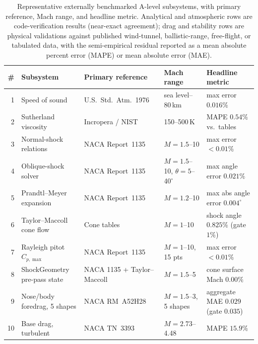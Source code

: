 \begin{table}[htbp]
\centering
\caption{Representative externally benchmarked A-level subsystems, with primary
reference, Mach range, and headline metric. Analytical and atmospheric rows are
code-verification results (near-exact agreement); drag and stability rows are
physical validations against published wind-tunnel, ballistic-range, free-flight,
or tabulated data, with the semi-empirical residual reported as a mean absolute
percent error (MAPE) or mean absolute error (MAE).}
\label{tab:benchmarks}
\begingroup\footnotesize
\begin{tabular}{@{}r p{} p{} p{} p{}@{}}
\toprule
\# & Subsystem & Primary reference & Mach range & Headline metric \\
\midrule
1  & Speed of sound                & U.S.\ Std.\ Atm.\ 1976~\cite{nasa1976ussa}        & sea level--80\,km          & max error $0.016\%$ \\
2  & Sutherland viscosity          & Incropera / NIST~\cite{incropera2007}             & 150--500\,K                & MAPE $0.54\%$ vs.\ tables \\
3  & Normal-shock relations        & NACA Report~1135~\cite{naca1135}                  & $M = 1.5$--10              & max error $<0.01\%$ \\
4  & Oblique-shock solver          & NACA Report~1135~\cite{naca1135}                  & $M = 1.5$--10, $\theta = 5$--40$^\circ$ & max angle error $0.021\%$ \\
5  & Prandtl--Meyer expansion      & NACA Report~1135~\cite{naca1135}                  & $M = 1.2$--10              & max abs angle error $0.004^{\circ}$ \\
6  & Taylor--Maccoll cone flow     & Cone tables~\cite{taylormaccoll1933,anderson2006} & $M = 1$--10                & shock angle $0.825\%$ (gate $1\%$) \\
7  & Rayleigh pitot $C_{p,\max}$   & NACA Report~1135~\cite{naca1135}                  & $M = 1$--10, 15 pts        & max error $<0.01\%$ \\
8  & ShockGeometry pre-pass state  & NACA 1135 + Taylor--Maccoll                       & $M = 1.5$--5               & cone surface Mach $0.00\%$ \\
9  & Nose/body foredrag, 5 shapes  & NACA RM~A52H28~\cite{a52h28}                      & $M = 1.5$--3, 5 shapes     & aggregate MAE $0.029$ (gate $0.035$) \\
10 & Base drag, turbulent          & NACA TN~3393~\cite{chapman1955}                   & $M = 2.73$--4.48           & MAPE $15.9\%$ \\

\end{tabular}
\end{table}
